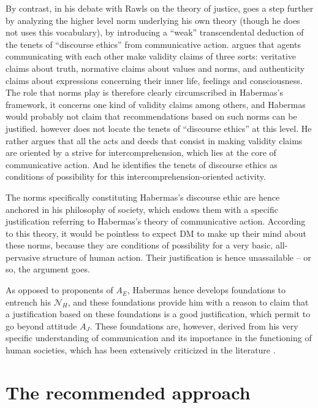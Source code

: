 \documentclass[preprint, french, english, 11pt, authoryear]{elsarticle}%
\begin{document}
By contrast, in his debate with Rawls on the theory of justice, \citet{habermas_moralbewustsein_1983} goes a step further by analyzing the higher level norm underlying his own theory (though he does not uses this vocabulary),
by introducing a “weak” transcendental deduction of the tenets of “discourse ethics” from communicative action. 
\citet{habermas_theorie_1981} argues that agents communicating with each other make validity claims of three sorts: veritative claims about truth, normative claims about values and norms, and authenticity claims about expressions concerning their inner life, feelings and consciousness. 
The role that norms play is therefore clearly circumscribed in Habermas's framework, it concerns one kind of validity claims among others, and Habermas would probably not claim that recommendations based on such norms can be justified. 
\cite{habermas_moralbewustsein_1983} however does not locate the tenets of “discourse ethics” at this level. 
He rather argues that all the acts and deeds that consist in making validity claims are oriented by a strive for intercomprehension, which lies at the core of communicative action. And he identifies the tenets of discourse ethics as conditions of possibility for this intercomprehension-oriented activity. 


The norms specifically constituting Habermas's discourse ethic are hence anchored in his philosophy of society, which endows them with a specific justification referring to Habermas's theory of communicative action.
According to this theory, it would be pointless to expect DM%
 to make up their mind about these norms, because 
they are conditions of possibility for a very basic, all-pervasive structure of human action. Their justification is hence unassailable -- or so, the argument goes.

As opposed to proponents of $A_E$, Habermas hence develops foundations to entrench his $\mathscr{N}_{H}$, and these foundations provide him with a reason to claim that a justification based on these foundations is a good justification, which permit to go beyond attitude $A_J$. 
These foundations are, however, derived from his very specific understanding of communication and its importance in the functioning of human societies, which has been extensively criticized in the literature \citep{heath_communicative_2001,honneth_kritik_1985,benhabib_situating_1992}. 


\section{The recommended approach}
\label{sec:recomm}
\end{document}
